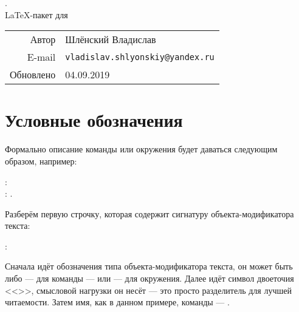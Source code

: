 \newpage 

\thispagestyle{empty}

\vspace*{7cm}
\begin{center}
    { \huge {}. } \\[1cm]
    { \Large \LaTeX-пакет для  }\\
\end{center}


\vspace*{7cm}
\begin{flushright}
    \begin{tabular}{@{}r@{\hskip .75cm}l@{}}
        Автор &  Шлёнский Владислав \\
        E-mail & \texttt{vladislav.shlyonskiy@yandex.ru} \\
        Обновлено & 04.09.2019
    \end{tabular}
\end{flushright}


\newpage

\tableofcontents

\newpage




\section{Условные обозначения}

Формально описание команды или окружения будет даваться следующим образом, например:
\begin{tcolorbox}
    \small \rsTypeAux: \\
    \hspace*{1cm} \rsOptionsAux: . 
\end{tcolorbox}

Разберём первую строчку, которая содержит сигнатуру объекта-модификатора текста:
\begin{center}
    \rsTypeAux:
\end{center}
Сначала идёт обозначения типа объекта-модификатора текста, он может быть либо \rsTypeAux\space --- для команды --- или \rsTypeAux[env] --- для окружения. Далее идёт символ двоеточия <<\rsCodeAux{:}>>, смысловой нагрузки он несёт --- это просто разделитель для лучшей читаемости. Затем имя, как в данном примере, команды --- . 

